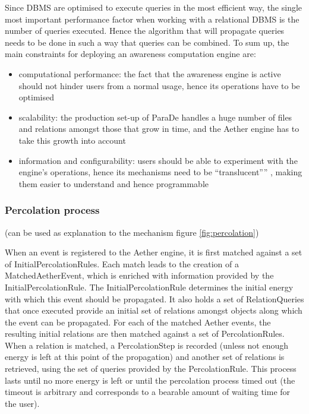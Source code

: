 \documentclass{ecscw2007}
\begin{document}
Since DBMS are optimised to execute queries in the most efficient way, the single most important performance factor when working with a relational DBMS is the number of queries executed. Hence the algorithm that will propagate queries needs to be done in such a way that queries can be combined.
To sum up, the main constraints for deploying an awareness computation engine are:
\begin{itemize}
     \item computational performance: the fact that the awareness engine is active should not hinder users from a normal usage, hence its operations have to be optimised
     \item scalability: the production set-up of ParaDe handles a huge number of files and relations amongst those that grow in time, and the Aether engine has to take this growth into account
     \item information and configurability: users should be able to experiment with the engine’s operations, hence its mechanisms need to be ``translucent'''' , making them easier to understand and hence programmable
\end{itemize}



\subsubsection*{Percolation process}
(can be used as explanation to the mechanism figure \ref{fig:percolation})

When an event is registered to the Aether engine, it is first matched against a set of InitialPercolationRules. Each match leads to the creation of a MatchedAetherEvent, which is enriched with information provided by the InitialPercolationRule. The InitialPercolationRule determines the initial energy with which this event should be propagated. It also holds a set of RelationQueries that once executed provide an initial set of relations amongst objects along which the event can be propagated.
For each of the matched Aether events, the resulting initial relations are then matched against a set of PercolationRules. When a relation is matched, a PercolationStep is recorded (unless not enough energy is left at this point of the propagation) and another set of relations is retrieved, using the set of queries provided by the PercolationRule. This process lasts until no more energy is left or until the percolation process timed out (the timeout is arbitrary and corresponds to a bearable amount of waiting time for the user).
\end{document}
